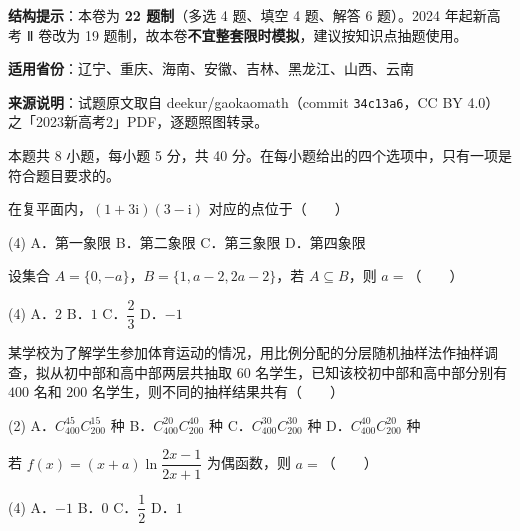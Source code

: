 

\begin{gknotice}
\textbf{结构提示}：本卷为 \textbf{22 题制}（多选 4 题、填空 4 题、解答 6 题）。2024 年起新高考 Ⅱ 卷改为 19 题制，故本卷\textbf{不宜整套限时模拟}，建议按知识点抽题使用。

\textbf{适用省份}：辽宁、重庆、海南、安徽、吉林、黑龙江、山西、云南

\textbf{来源说明}：试题原文取自 deekur/gaokaomath（commit \texttt{34c13a6}，CC BY 4.0）之「2023新高考2」PDF，逐题照图转录。
\end{gknotice}

\par\medskip


\begin{gktip}
本题共 8 小题，每小题 5 分，共 40 分。在每小题给出的四个选项中，只有一项是符合题目要求的。
\end{gktip}

在复平面内，$(1+3\mathrm i)(3-\mathrm i)$ 对应的点位于（　　）

\begin{gkopts}(4)
\task A．第一象限
\task B．第二象限
\task C．第三象限
\task D．第四象限
\end{gkopts}

设集合 $A=\{0,-a\}$，$B=\{1,a-2,2a-2\}$，若 $A\subseteq B$，则 $a=$（　　）

\begin{gkopts}(4)
\task A．$2$
\task B．$1$
\task C．$\dfrac23$
\task D．$-1$
\end{gkopts}

某学校为了解学生参加体育运动的情况，用比例分配的分层随机抽样法作抽样调查，拟从初中部和高中部两层共抽取 $60$ 名学生，已知该校初中部和高中部分别有 $400$ 名和 $200$ 名学生，则不同的抽样结果共有（　　）

\begin{gkopts}(2)
\task A．$C_{400}^{45}C_{200}^{15}$ 种
\task B．$C_{400}^{20}C_{200}^{40}$ 种
\task C．$C_{400}^{30}C_{200}^{30}$ 种
\task D．$C_{400}^{40}C_{200}^{20}$ 种
\end{gkopts}

若 $f(x)=(x+a)\ln\dfrac{2x-1}{2x+1}$ 为偶函数，则 $a=$（　　）

\begin{gkopts}(4)
\task A．$-1$
\task B．$0$
\task C．$\dfrac12$
\task D．$1$
\end{gkopts}

